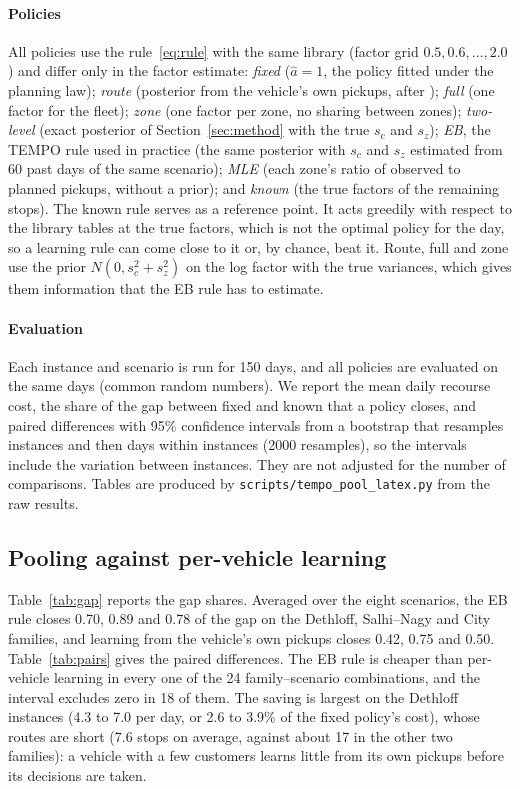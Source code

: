 \documentclass[preprint,authoryear,12pt]{elsarticle}
\begin{document}
\paragraph{Policies} All policies use the rule~\eqref{eq:rule} with the
same library (factor grid $0.5, 0.6, \dots, 2.0$) and differ only in the
factor estimate: \emph{fixed} ($\hat a = 1$, the policy fitted under the
planning law); \emph{route} (posterior from the vehicle's own pickups,
after \citealp{florio2023bayesian}); \emph{full} (one factor for the
fleet); \emph{zone} (one factor per zone, no sharing between zones);
\emph{two-level} (exact posterior of Section~\ref{sec:method} with the
true $s_c$ and $s_z$); \emph{EB}, the TEMPO rule used in practice (the
same posterior with $s_c$ and $s_z$ estimated from 60 past days of the
same scenario); \emph{MLE} (each zone's ratio of observed to planned
pickups, without a prior); and \emph{known} (the true factors of the
remaining stops). The known rule serves as a reference point. It acts
greedily with respect to the library tables at the true factors, which
is not the optimal policy for the day, so a learning rule can come
close to it or, by chance, beat it. Route, full and zone use the prior
$N(0, s_c^2 + s_z^2)$ on the log factor with the true variances, which
gives them information that the EB rule has to estimate.

\paragraph{Evaluation} Each instance and scenario is run for 150 days,
and all policies are evaluated on the same days (common random
numbers). We report the mean daily recourse cost, the share of the gap
between fixed and known that a policy closes, and paired differences
with 95\% confidence intervals from a bootstrap that resamples instances
and then days within instances (2000 resamples), so the intervals
include the variation between instances. They are not adjusted for
the number of comparisons.
Tables are produced by \texttt{scripts/tempo\_pool\_latex.py} from the
raw results.

\subsection{Pooling against per-vehicle learning}

Table~\ref{tab:gap} reports the gap shares. Averaged over the eight
scenarios, the EB rule closes 0.70, 0.89 and 0.78 of the gap on the
Dethloff, Salhi--Nagy and City families, and learning from the vehicle's
own pickups closes 0.42, 0.75 and 0.50. Table~\ref{tab:pairs} gives the
paired differences. The EB rule is cheaper than per-vehicle learning in
every one of the 24 family--scenario combinations, and the interval
excludes zero in 18 of them. The saving is largest on the Dethloff
instances (4.3 to 7.0 per day, or 2.6 to 3.9\% of the fixed policy's
cost), whose routes are short (7.6 stops on average, against about 17 in
the other two families): a vehicle with a few customers learns
little from its own pickups before its decisions are taken.
\end{document}
